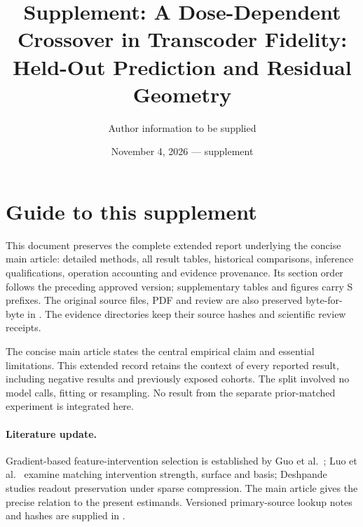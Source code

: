 \documentclass[11pt]{article}
\title{Supplement: A Dose-Dependent Crossover in Transcoder Fidelity:\\Held-Out Prediction and Residual Geometry}
\author{Author information to be supplied}
\date{November 4, 2026 --- supplement}
\begin{document}
\maketitle
\section*{Guide to this supplement}
This document preserves the complete extended report underlying the concise main article: detailed methods, all result tables, historical comparisons, inference qualifications, operation accounting and evidence provenance. Its section order follows the preceding approved version; supplementary tables and figures carry S prefixes. The original source files, PDF and review are also preserved byte-for-byte in . The evidence directories keep their source hashes and scientific review receipts.

The concise main article states the central empirical claim and essential limitations. This extended record retains the context of every reported result, including negative results and previously exposed cohorts. The split involved no model calls, fitting or resampling. No result from the separate prior-matched experiment is integrated here.

\paragraph{Literature update.} Gradient-based feature-intervention selection is established by Guo et al.~\cite{guo2026}; Luo et al.~\cite{luo2026} examine matching intervention strength, surface and basis; Deshpande~\cite{deshpande2026} studies readout preservation under sparse compression. The main article gives the precise relation to the present estimands. Versioned primary-source lookup notes and hashes are supplied in .
\clearpage

\clearpage
\small


\end{document}
